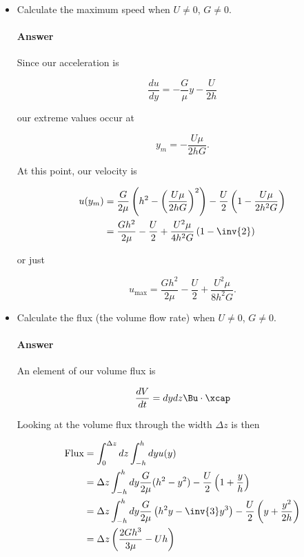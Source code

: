 \begin{itemize}
\item Calculate the maximum speed when $U \ne 0$, $G \ne 0$.
\paragraph{Answer}

Since our acceleration is

\begin{equation}\label{eqn:continuumMidTermReflection:690}
\frac{du}{dy} = -\frac{G}{\mu} y - \frac{U}{2 h}
\end{equation}

our extreme values occur at 

\begin{equation}\label{eqn:continuumMidTermReflection:710}
y_m = -\frac{U \mu}{2 h G}.
\end{equation}

At this point, our velocity is

\begin{align*}
u(y_m) 
&= 
\frac{G}{2 \mu} \left(h^2 - 
\left( \frac{U \mu}{2 h G} \right)^2
\right) - \frac{U}{2} \left( 1 
-\frac{U \mu}{2 h^2 G}
\right) \\
&=
\frac{G h^2}{2 \mu} -\frac{U}{2}
+ \frac{U^2 \mu}{4 h^2 G} \left(
1 -\inv{2}
\right)
\end{align*}

or just

\begin{equation}\label{eqn:continuumMidTermReflection:730}
u_{\text{max}} = \frac{G h^2}{2 \mu} -\frac{U}{2} + \frac{U^2 \mu}{8 h^2 G}.
\end{equation}

\item Calculate the flux (the volume flow rate) when $U \ne 0$, $G \ne 0$.
\paragraph{Answer}

An element of our volume flux is

\begin{equation}\label{eqn:continuumMidTermReflection:750}
\frac{dV}{dt} = dy dz \Bu \cdot \xcap
\end{equation}

Looking at the volume flux through the width $\Delta z$ is then

\begin{align*}
\text{Flux} 
&= \int_0^{\Delta z} dz \int_{-h}^h dy u(y) \\
&= \Delta z 
\int_{-h}^h dy 
\frac{G}{2 \mu} (h^2 - y^2) - \frac{U}{2} \left( 1 + \frac{y}{h} \right) \\
&= \Delta z 
\int_{-h}^h dy 
\frac{G}{2 \mu} \left(h^2 y - \inv{3} y^3 \right) - \frac{U}{2} \left( y + \frac{y^2}{2 h} \right) \\
&= \Delta z 
\left( \frac{2 G h^3}{3 \mu} - U h \right)
\end{align*}


\end{itemize}

